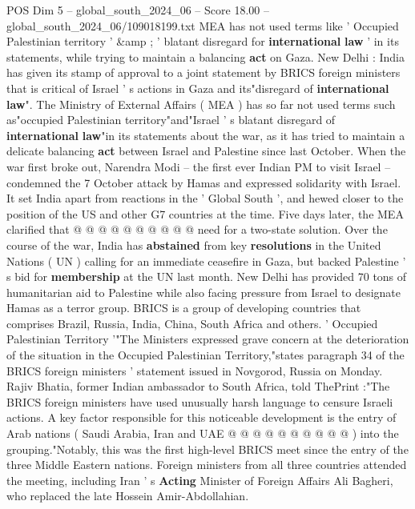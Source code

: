 \begin{textsample}{POS Dim 5 – global\_south\_2024\_06 – Score 18.00 – global\_south\_2024\_06/109018199.txt}  \label{ex:f5_pos_222}
MEA has not used terms like ' Occupied Palestinian territory ' \&amp ; ' blatant disregard for \textbf{international} \textbf{law} ' in its statements, while trying to maintain a balancing \textbf{act} on Gaza.
New Delhi : India has given its stamp of approval to a joint statement by BRICS foreign ministers that is critical of Israel ' s actions in Gaza and its"disregard of \textbf{international} \textbf{law}".
The Ministry of External Affairs ( MEA ) has so far not used terms such as"occupied Palestinian territory"and"Israel ' s blatant disregard of \textbf{international} \textbf{law}"in its statements about the war, as it has tried to maintain a delicate balancing \textbf{act} between Israel and Palestine since last October.
When the war first broke out, Narendra Modi -- the first ever Indian PM to visit Israel -- condemned the 7 October attack by Hamas and expressed solidarity with Israel.
It set India apart from reactions in the ' Global South ', and hewed closer to the position of the US and other G7 countries at the time.
Five days later, the MEA clarified that @ @ @ @ @ @ @ @ @ @ need for a two-state solution.
Over the course of the war, India has \textbf{abstained} from key \textbf{resolutions} in the United Nations ( UN ) calling for an immediate ceasefire in Gaza, but backed Palestine ' s bid for \textbf{membership} at the UN last month.
New Delhi has provided 70 tons of humanitarian aid to Palestine while also facing pressure from Israel to designate Hamas as a terror group.
BRICS is a group of developing countries that comprises Brazil, Russia, India, China, South Africa and others. ' Occupied Palestinian Territory '"The Ministers expressed grave concern at the deterioration of the situation in the Occupied Palestinian Territory,"states paragraph 34 of the BRICS foreign ministers ' statement issued in Novgorod, Russia on Monday.
Rajiv Bhatia, former Indian ambassador to South Africa, told ThePrint :"The BRICS foreign ministers have used unusually harsh language to censure Israeli actions.
A key factor responsible for this noticeable development is the entry of Arab nations ( Saudi Arabia, Iran and UAE @ @ @ @ @ @ @ @ @ @ ) into the grouping."Notably, this was the first high-level BRICS meet since the entry of the three Middle Eastern nations.
Foreign ministers from all three countries attended the meeting, including Iran ' s \textbf{Acting} Minister of Foreign Affairs Ali Bagheri, who replaced the late Hossein Amir-Abdollahian.

\end{textsample}
